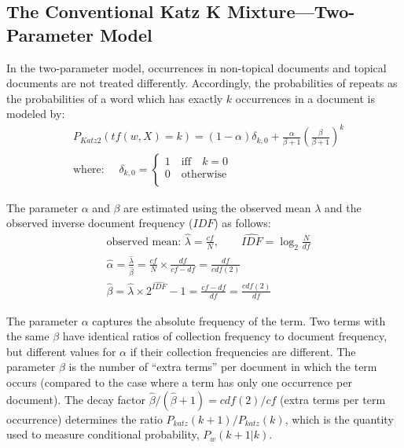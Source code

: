 \documentclass[english]{jnlp_1.4_rep}
\begin{document}
\subsection{The Conventional Katz K Mixture---Two-Parameter Model}
In the two-parameter model, occurrences in non-topical documents and topical documents are not treated differently. Accordingly, the probabilities
of repeats as the probabilities of a word which has exactly $k$ occurrences in a document is modeled by:
\begin{align*}
 & P_{\mathit{Katz}2}(\mathit{tf}(w,X)=k) = (1 - \alpha)\delta_{k,0} + \frac{\alpha}{\beta + 1}\left(\frac{\beta}{\beta +1}\right)^k \\
 & \mbox{where: } \quad
  \delta _{k,0} = \left\{
            \begin{array}{l}
                1 \quad \mbox{iff} \quad k = 0 \\
                0 \quad \mbox{otherwise}\\
            \end{array} \right. 
\end{align*}

The parameter $\alpha$ and $\beta$ are estimated using the observed
mean $\lambda$ and the observed inverse document frequency
($\mathit{IDF}$) as follows:
\begin{align*}
 & \mbox{observed mean:  }
 	\hat{\lambda} = \frac{\mathit{cf}}{N}, \qquad
 	\hat{\mathit{IDF}}     = \log _2\frac{N}{\mathit{df}} \\
 & \hat{\alpha}  = \frac{\hat{\lambda}}{\hat{\beta}}= \frac{\mathit{cf}}{N} \times \frac{\mathit{df}}{\mathit{cf} - \mathit{df}} 
	= \frac{\mathit{df}}{\mathit{cdf}(2)} \\
 & \hat{\beta}   = \hat{\lambda} \times 2^{\hat{\mathit{IDF}}}-1 = \frac{\mathit{cf} - \mathit{df}}{\mathit{df}}
	=\frac{\mathit{cdf}(2)}{\mathit{df}}
\end{align*}

The parameter $\alpha$ captures the absolute frequency of the term. Two terms with the same $\beta$ have identical ratios of collection frequency to
document frequency, but different values for $\alpha$ if their collection frequencies are different. The parameter $\beta$ is the number of ``extra
terms'' per document in which the term occurs (compared to the case where a term has only one occurrence per document). The decay factor 
$\hat{\beta}/ (\hat{\beta}+1)= \mathit{cdf}(2) / \mathit{cf}$ (extra terms per term occurrence) determines the ratio 
$P_{\mathit{katz}}(k+1) /P_{\mathit{katz}}(k)$, which is the quantity used to measure conditional probability, $P_{w}(k+1|k)$.
\end{document}
